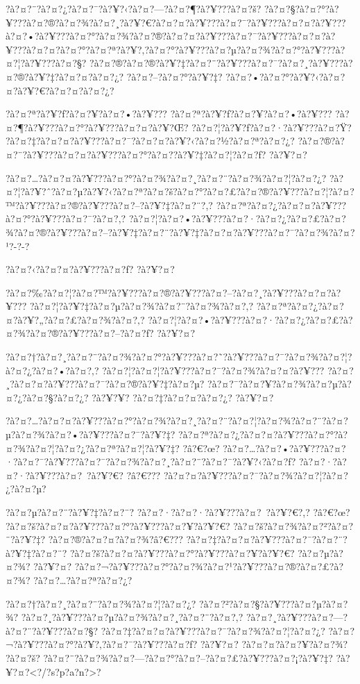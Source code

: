 \documentclass[11pt, openany]{book}
\begin{document}
{{{{{{{?à?¤?¨?à?¤?¿?à?¤?¯?à?¥?‹?à?¤?---?à?¤?¶?à?¥???à?¤?š?
?à?¤?§?à?¤?°?à?¥???à?¤?®?à?¤?¾?à?¤?¸?à?¥?€?à?¤?¤?à?¥???à?¤?¯?à?¥???à?¤?¤?à?¥???à?¤?•?à?¥???à?¤?°?à?¤?¾?à?¤?®?à?¤?¤?à?¥???à?¤?¯?à?¥???à?¤?¤?à?¥???à?¤?¤?à?¤?°?à?¤?ª?à?¥?‚?à?¤?°?à?¥???à?¤?µ?à?¤?¾?à?¤?°?à?¥???à?¤?¦?à?¥???à?¤?§?
?à?¤?®?à?¤?®?à?¥?‡?à?¤?¨?à?¥???à?¤?¯?à?¤?¸?à?¥???à?¤?®?à?¥?‡?à?¤?¤?à?¤?¿?
?à?¤?--?à?¤?°?à?¥?‡? ?à?¤?•?à?¤?°?à?¥?‹?à?¤?¤?à?¥?€?à?¤?¤?à?¤?¿?

?à?¤?ª?à?¥?ƒ?à?¤?¥?à?¤?•?à?¥??? ?à?¤?ª?à?¥?ƒ?à?¤?¥?à?¤?•?à?¥???
?à?¤?¶?à?¥???à?¤?°?à?¥???à?¤?¤?à?¥?Œ? ?à?¤?¦?à?¥?ƒ?à?¤?·?à?¥???à?¤?Ÿ?
?à?¤?‡?à?¤?¤?à?¥???à?¤?¯?à?¤?¤?à?¥?‹?à?¤?½?à?¤?ª?à?¤?¿?
?à?¤?®?à?¤?¨?à?¥???à?¤?¤?à?¥???à?¤?°?à?¤?­?à?¥?‡?à?¤?¦?à?¤?ƒ? ?à?¥?¤?

?à?¤?\ldots{}?à?¤?¤?à?¥???à?¤?°?à?¤?¾?à?¤?¸?à?¤?¨?à?¤?¾?à?¤?¦?à?¤?¿?
?à?¤?¦?à?¥?ˆ?à?¤?µ?à?¥?‹?à?¤?ª?à?¤?š?à?¤?°?à?¤?£?à?¤?®?à?¥???à?¤?¦?à?¤?™?à?¥???à?¤?®?à?¥???à?¤?--?à?¥?‡?à?¤?¨?,?
?à?¤?ª?à?¤?¿?à?¤?¤?à?¥???à?¤?°?à?¥???à?¤?¯?à?¤?‚?
?à?¤?¦?à?¤?•?à?¥???à?¤?·?à?¤?¿?à?¤?£?à?¤?¾?à?¤?®?à?¥???à?¤?--?à?¥?‡?à?¤?¨?à?¥?‡?à?¤?¤?à?¥???à?¤?¯?à?¤?¾?à?¤?¹?-?-?

?à?¤?‹?à?¤?¤?à?¥???à?¤?ƒ? ?à?¥?¤?

?à?¤?‰?à?¤?¦?à?¤?™?à?¥???à?¤?®?à?¥???à?¤?--?à?¤?¸?à?¥???à?¤?¤?à?¥???
?à?¤?¦?à?¥?‡?à?¤?µ?à?¤?¾?à?¤?¨?à?¤?¾?à?¤?‚?
?à?¤?ª?à?¤?¿?à?¤?¤?à?¥?„?à?¤?£?à?¤?¾?à?¤?‚?
?à?¤?¦?à?¤?•?à?¥???à?¤?·?à?¤?¿?à?¤?£?à?¤?¾?à?¤?®?à?¥???à?¤?--?à?¤?ƒ?
?à?¥?¤?

?à?¤?†?à?¤?¸?à?¤?¨?à?¤?¾?à?¤?°?à?¥???à?¤?˜?à?¥???à?¤?¯?à?¤?¾?à?¤?¦?à?¤?¿?à?¤?•?à?¤?‚?
?à?¤?¦?à?¤?¦?à?¥???à?¤?¯?à?¤?¾?à?¤?¤?à?¥???
?à?¤?¸?à?¤?¤?à?¥???à?¤?¯?à?¤?®?à?¥?‡?à?¤?µ?
?à?¤?¯?à?¤?¥?à?¤?¾?à?¤?µ?à?¤?¿?à?¤?§?à?¤?¿? ?à?¥?¥? ?à?¤?‡?à?¤?¤?à?¤?¿?
?à?¥?¤?

?à?¤?\ldots{}?à?¤?¤?à?¥???à?¤?°?à?¤?¾?à?¤?¸?à?¤?¨?à?¤?¦?à?¤?¾?à?¤?¨?à?¤?µ?à?¤?¾?à?¤?•?à?¥???à?¤?¯?à?¥?‡?
?à?¤?ª?à?¤?¿?à?¤?¤?à?¥???à?¤?°?à?¤?¾?à?¤?¦?à?¤?¿?à?¤?ª?à?¤?¦?à?¥?‡?
?â?€?œ?
?à?¤?\ldots{}?à?¤?•?à?¥???à?¤?·?à?¤?¯?à?¥???à?¤?¯?à?¤?¾?à?¤?¸?à?¤?¨?à?¤?¯?à?¥?‹?à?¤?ƒ?
?à?¤?·?à?¤?·?à?¥???à?¤?~?à?¥?€? ?â?€???
?à?¤?¤?à?¥???à?¤?¯?à?¤?¾?à?¤?¦?à?¤?¿?à?¤?µ?

?à?¤?µ?à?¤?¨?à?¥?‡?à?¤?¨? ?à?¤?·?à?¤?·?à?¥???à?¤?~?à?¥?€?,? ?â?€?œ?
?à?¤?š?à?¤?¤?à?¥???à?¤?°?à?¥???à?¤?¥?à?¥?€?
?à?¤?š?à?¤?¾?à?¤?²?à?¤?¨?à?¥?‡? ?à?¤?®?à?¤?¤?à?¤?¾?â?€???
?à?¤?‡?à?¤?¤?à?¥???à?¤?¯?à?¤?¨?à?¥?‡?à?¤?¨?
?à?¤?š?à?¤?¤?à?¥???à?¤?°?à?¥???à?¤?¥?à?¥?€? ?à?¤?µ?à?¤?¾? ?à?¥?¤?
?à?¤?¬?à?¥???à?¤?°?à?¤?¾?à?¤?¹?à?¥???à?¤?®?à?¤?£?à?¤?¾?
?à?¤?\ldots{}?à?¤?ª?à?¤?¿?

?à?¤?†?à?¤?¸?à?¤?¨?à?¤?¾?à?¤?¦?à?¤?¿? ?à?¤?²?à?¤?§?à?¥???à?¤?µ?à?¤?¾?
?à?¤?¸?à?¥???à?¤?µ?à?¤?¾?à?¤?¸?à?¤?¨?à?¤?‚?
?à?¤?¸?à?¥???à?¤?---?à?¤?¨?à?¥???à?¤?§?
?à?¤?‡?à?¤?¤?à?¥???à?¤?¯?à?¤?¾?à?¤?¦?à?¤?¿?
?à?¤?¬?à?¥???à?¤?°?à?¥?‚?à?¤?¯?à?¥???à?¤?ƒ? ?à?¥?¤? ?à?¤?¤?à?¤?¥?à?¤?¾?
?à?¤?š? ?à?¤?¨?à?¤?¾?à?¤?---?à?¤?°?à?¤?--?à?¤?£?à?¥???à?¤?¡?à?¥?‡?
?à?¥?¤?\textless{}?/?s?p?a?n?\textgreater{}?

}}}}}}}
\end{document}
